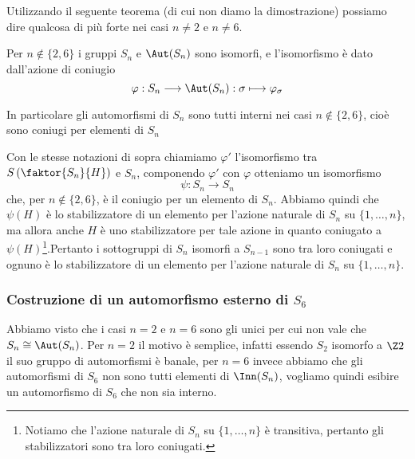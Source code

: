 \documentclass[11pt]{scrartcl}
\begin{document}
Utilizzando il seguente teorema (di cui non diamo la dimostrazione) possiamo
dire qualcosa di più forte nei casi $n \neq 2$ e $n \neq 6$.

\begin{theorem}
    Per $n \notin \{2, 6\}$ i gruppi $S_n$ e $\Aut(S_n)$ sono isomorfi, e 
    l'isomorfismo è dato dall'azione di coniugio
    \[
        \varphi: S_n \longrightarrow \Aut(S_n): \sigma \longmapsto \varphi_{\sigma}
    \]
\end{theorem}

\begin{remark}
    In particolare gli automorfismi di $S_n$ sono tutti interni nei casi $n \notin \{2, 6\}$,
    cioè sono coniugi per elementi di $S_n$
\end{remark}

Con le stesse notazioni di sopra chiamiamo $\varphi'$ l'isomorfismo tra
$S\left(\faktor{S_n}{H}\right)$ e $S_n$, componendo $\varphi'$ con $\varphi$ 
otteniamo un isomorfismo
\[
    \psi :S_n \longrightarrow S_n
\]
che, per $n \notin \{2, 6\}$, è il coniugio per un elemento di $S_n$. Abbiamo
quindi che $\psi(H)$ è lo stabilizzatore di un elemento per l'azione naturale
di $S_n$ su $\{1, \ldots, n\}$, ma allora anche $H$ è uno stabilizzatore per tale
azione in quanto coniugato a $\psi(H)$\footnote{
    Notiamo che l'azione naturale di $S_n$ su $\{1, \ldots, n\}$ è transitiva,
    pertanto gli stabilizzatori sono tra loro coniugati.
}.Pertanto i sottogruppi di $S_n$ isomorfi a $S_{n - 1}$ sono tra loro coniugati
e ognuno è lo stabilizzatore di un elemento per l'azione naturale di $S_n$
su $\{1, \ldots, n\}$.

\subsubsection{Costruzione di un automorfismo esterno di $S_6$}

Abbiamo visto che i casi $n = 2$ e $n = 6$ sono gli unici per cui non vale 
che $S_n \cong \Aut(S_n)$. Per $n = 2$ il motivo è semplice, infatti essendo
$S_2$ isomorfo a $\Z2$ il suo gruppo di automorfismi è banale, per $n = 6$
invece abbiamo che gli automorfismi di $S_6$ non sono tutti elementi di $\Inn(S_n)$,
vogliamo quindi esibire un automorfismo di $S_6$ che non sia interno.\newline
\end{document}
